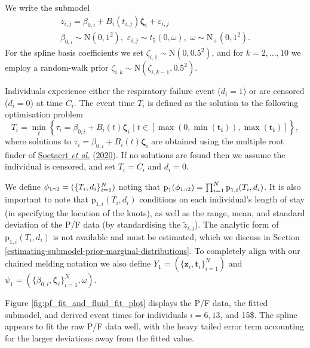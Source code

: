 \documentclass[
  10pt,
  a4paper,
]{article}
\let\Oldcap\cap
\renewcommand{\cap}{\mathrel{\mathsmaller{\Oldcap}}}
\newcommand{\pd}{\text{p}}
\begin{document}
We write the submodel \begin{equation}
\begin{gathered}
  z_{i, j} = \beta_{0, i} + B_{i}(t_{i, j})\boldsymbol{\zeta}_{i} + \varepsilon_{i, j} \\
  \beta_{0, i} \sim \text{N}(0, 1^2), \,\, \varepsilon_{i, j} \sim t_{5}(0, \omega), \,\,  \omega \sim \text{N}_{+}(0, 1^2).
\end{gathered}
\end{equation} For the spline basis coefficients we set
\(\zeta_{i, 1} \sim \text{N}(0, 0.5^2)\), and for \(k = 2, \ldots, 10\)
we employ a random-walk prior
\(\zeta_{i, k} \sim \text{N}(\zeta_{i, k - 1}, 0.5^2)\).

Individuals experience either the respiratory failure event
(\(d_{i} = 1\)) or are censored (\(d_{i} = 0\)) at time \(C_{i}\). The
event time \(T_{i}\) is defined as the solution to the following
optimisation problem \begin{equation}
  T_{i} = \min_{t} \left\{
    \tau_{i} = \beta_{0, i} + B_{i}(t)\boldsymbol{\zeta}_{i}
    \mid
    t \in [\max(0, \min(\boldsymbol{t_{i}})), \max(\boldsymbol{t_{i}})]
  \right\},
  \label{eqn:event_time_model_def}
\end{equation} where solutions to
\(\tau_{i} = \beta_{0, i} + B_{i}(t)\boldsymbol{\zeta}_{i}\) are
obtained using the multiple root finder of
\protect\hyperlink{ref-soetaert_rootsolve_2020}{Soetaert \emph{et al.}}
(\protect\hyperlink{ref-soetaert_rootsolve_2020}{2020}). If no solutions
are found then we assume the individual is censored, and set
\(T_{i} = C_{i}\) and \(d_{i} = 0\).

We define \(\phi_{1 \cap 2} = (\{T_{i}, d_{i}\}_{i = 1}^{N})\) noting
that
\(\pd_{1}(\phi_{1 \cap 2}) = \prod_{i = 1}^{N}\pd_{1, i}(T_{i}, d_{i})\).
It is also important to note that \(\pd_{1, i}(T_{i}, d_{i})\)
conditions on each individual's length of stay (in specifying the
location of the knots), as well as the range, mean, and standard
deviation of the P/F data (by standardising the \(\tilde{z}_{i, j}\)).
The analytic form of \(\pd_{1, i}(T_{i}, d_{i})\) is not available and
must be estimated, which we discuss in Section
\ref{estimating-submodel-prior-marginal-distributions}. To completely
align with our chained melding notation we also define
\(Y_{1} = (\{\boldsymbol{z}_{i}, \boldsymbol{t}_{i}\}_{i = 1}^{N})\) and
\(\psi_{1} = (\{\beta_{0, i}, \boldsymbol{\zeta}_{i}\}_{i = 1}^{N}, \omega)\).

Figure \ref{fig:pf_fit_and_fluid_fit_plot} displays the P/F data, the
fitted submodel, and derived event times for individuals \(i = 6, 13\),
and 15\$. The spline appears to fit the raw P/F data well, with the
heavy tailed error term accounting for the larger deviations away from
the fitted value.
\end{document}
